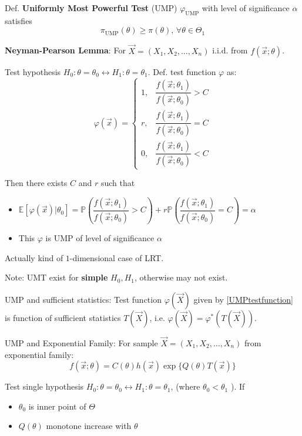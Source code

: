     Def. \textbf{Uniformly Most Powerful Test} (UMP) $\varphi_{\mathrm{UMP}}$ with level of significance $\alpha$ satisfies
    \begin{equation}
        \pi_{\mathrm{UMP}}(\theta)\geq\pi(\theta),\,\forall\theta\in\Theta_1
    \end{equation}

    \textbf{Neyman-Pearson Lemma}: For $\vec{X}=(X_1,X_2,\ldots,X_n)$ i.i.d. from $f(\vec{x};\theta)$. 
    
    Test hypothesis $H_0:\theta=\theta_0\longleftrightarrow H_1:\theta=\theta_1$. Def. test function $\varphi$ as:
    \begin{equation}\label{UMPtestfunction}
        \varphi(\vec{x})=\begin{cases}
            1,&\dfrac{f(\vec{x};\theta_1)}{f(\vec{x};\theta_0)}>C\\
            r,&\dfrac{f(\vec{x};\theta_1)}{f(\vec{x};\theta_0)}=C\\
            0,&\dfrac{f(\vec{x};\theta_1)}{f(\vec{x};\theta_0)}<C
        \end{cases}
    \end{equation}

    Then there exists $C$ and $r$ such that
    \begin{itemize}
        \item $\mathbb{E}[\varphi(\vec{x})|\theta_0]=\mathbb{P}(\dfrac{f(\vec{x};\theta_1)}{f(\vec{x};\theta_0)}>C)+r\mathbb{P}(\dfrac{f(\vec{x};\theta_1)}{f(\vec{x};\theta_0)}=C)=\alpha$
        \item This $\varphi$ is UMP of level of significance $\alpha$
    \end{itemize}

    Actually kind of $1$-dimensional case of LRT.

    Note: UMT exist for\textbf{ simple }$H_0,H_1$, otherwise may not exist.

    UMP and sufficient statistics: Test function $\varphi(\vec{X})$ given by \autoref{UMPtestfunction} is function of sufficient statistics $T(\vec{X})$, i.e. $\varphi(\vec{X})=\varphi^*(T(\vec{X}))$.

    UMP and Exponential Family: For sample $\vec{X}=(X_1,X_2,\dots,X_n)$ from exponential family:
    \begin{equation}
    f(\vec{x};\theta)=C(\theta)h(\vec{x})\exp\{Q(\theta)T(\vec{x})\}    
    \end{equation}

    Test single hypothesis $H_0:\theta=\theta_0\longleftrightarrow H_1:\theta=\theta_1$, (where $ \theta_0<\theta_1 $ ).
    If 
    \begin{itemize}[topsep=0.5pt,itemsep=0pt]
        \item $\theta_0$ is inner point of $\Theta$
        \item $Q(\theta)$  monotone increase with $\theta$
    \end{itemize}

